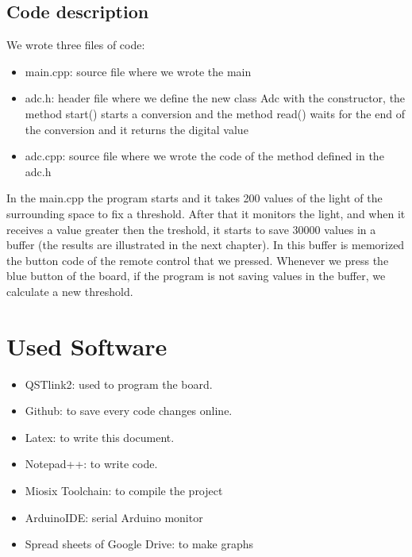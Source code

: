 \documentclass[18pt,oneside,a4paper,titlepage]{article}
\begin{document}
	\subsection{Code description}
		We wrote three files of code:
		\begin{itemize}
			\item main.cpp: source file where we wrote the main
			\item adc.h: header file where we define the new class Adc with the constructor, the method start() starts a conversion and the method read() waits for the end of the conversion and it returns the digital value
			\item adc.cpp: source file where we wrote the code of the method defined in the adc.h
		\end{itemize}
		In the main.cpp the program starts and it takes 200 values of the light of the surrounding space to fix a threshold. After that it monitors the light, and when it receives a value greater then the treshold, it starts to save 30000 values in a buffer (the results are illustrated in the next chapter). In this buffer is memorized the button code of the remote control that we pressed. Whenever we press the blue button of the board, if the program is not saving values in the buffer, we calculate a new threshold. 
\newpage
		
\newpage
\section{Used Software}
\begin{itemize}
	\item QSTlink2: used to program the board.
	\item Github: to save every code changes  online.
	\item Latex: to write this document.
	\item Notepad++: to write code.
	\item Miosix Toolchain: to compile the project
	\item ArduinoIDE: serial Arduino monitor 
	\item Spread sheets of Google Drive: to make graphs
\end{itemize}
\end{document}
